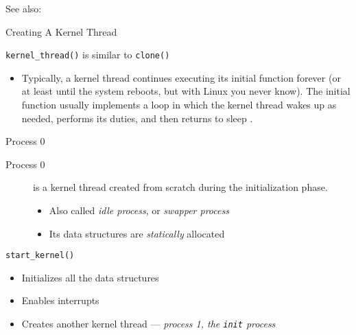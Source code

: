 See also: 

\begin{frame}{Creating A Kernel Thread}
  \begin{block}{\texttt{kernel\_thread()} is similar to \texttt{clone()}}
    \begin{center}
    \end{center}
  \end{block}
\end{frame}

\begin{itemize}
\item Typically, a kernel thread continues executing its initial function forever (or at
  least until the system reboots, but with Linux you never know). The initial function
  usually implements a loop in which the kernel thread wakes up as needed, performs its
  duties, and then returns to sleep .
\end{itemize}

\begin{frame}{Process 0}
  \begin{description}
  \item[Process 0] is a kernel thread created from scratch during the initialization
    phase.
    \begin{itemize}
    \item Also called \emph{idle process}, or \emph{swapper process}
    \item Its data structures are \emph{statically} allocated
    \end{itemize}
  \end{description}
  \begin{block}{\texttt{start\_kernel()}}
    \begin{itemize}
    \item Initializes all the data structures
    \item Enables interrupts
    \item Creates another kernel thread --- \emph{process 1, the \texttt{init} process}
    \end{itemize}
  \end{block}
\end{frame}

